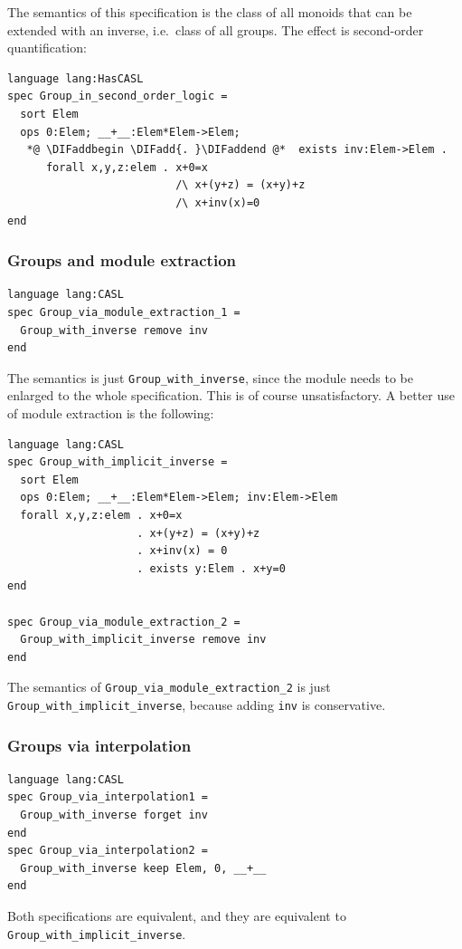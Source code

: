 \documentclass[10pt,fleqn,final]{scrreprt}
\newcommand*{\syntax}[1]{\texttt{#1}}
\newcommand{\sssclause}[1]{\subsubsection{#1}}
\providecommand{\DIFadd}[1]{{\protect\color{blue}\uwave{#1}}} %
\providecommand{\DIFaddbegin}{} %
\providecommand{\DIFaddend}{} %
\begin{document}
The semantics of this specification is the class of all monoids that
can be extended with an inverse, i.e.\ class of all groups. The effect
is second-order quantification:

\begin{lstlisting}[basicstyle=\ttfamily,language=dolText,alsolanguage=CASL,escapechar=@,mathescape]
language lang:HasCASL
spec Group_in_second_order_logic =
  sort Elem
  ops 0:Elem; __+__:Elem*Elem->Elem; 
   *@ \DIFaddbegin \DIFadd{. }\DIFaddend @*  exists inv:Elem->Elem .
      forall x,y,z:elem . x+0=x
                          /\ x+(y+z) = (x+y)+z
                          /\ x+inv(x)=0
end
\end{lstlisting}

\sssclause{Groups and module extraction}

\begin{lstlisting}[basicstyle=\ttfamily,language=dolText,alsolanguage=CASL,escapechar=@,mathescape]
language lang:CASL
spec Group_via_module_extraction_1 =
  Group_with_inverse remove inv
end
\end{lstlisting}
The semantics is just \syntax{Group\_with\_inverse},
since the module needs to be enlarged to the whole specification.
This is of course unsatisfactory. A better use of module extraction
is the following:

\begin{lstlisting}[basicstyle=\ttfamily,language=dolText,alsolanguage=CASL,escapechar=@,mathescape]
language lang:CASL
spec Group_with_implicit_inverse =
  sort Elem
  ops 0:Elem; __+__:Elem*Elem->Elem; inv:Elem->Elem
  forall x,y,z:elem . x+0=x
                    . x+(y+z) = (x+y)+z
                    . x+inv(x) = 0
                    . exists y:Elem . x+y=0
end

spec Group_via_module_extraction_2 =
  Group_with_implicit_inverse remove inv
end
\end{lstlisting}
The semantics of \syntax{Group\_via\_module\_extraction\_2} is just
\syntax{Group\_with\_implicit\_inverse}, because adding \texttt{inv}
is conservative.
\medskip

\sssclause{Groups via interpolation}

\begin{lstlisting}[basicstyle=\ttfamily,language=dolText,alsolanguage=CASL,escapechar=@,mathescape]
language lang:CASL
spec Group_via_interpolation1 =
  Group_with_inverse forget inv
end
spec Group_via_interpolation2 =
  Group_with_inverse keep Elem, 0, __+__
end
\end{lstlisting}
Both specifications are equivalent, and they 
are equivalent to \syntax{Group\_with\_implicit\_inverse}.
\medskip
\end{document}
